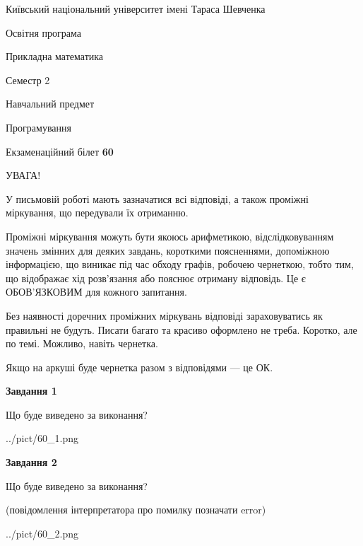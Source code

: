 \documentclass[12pt, ukrainian]{article}
\begin{document}
{{\begin {small}\par
{ \center  Київський національний університет імені Тараса Шевченка \par}
{\parbox {5 cm}{Освітня програма \hfill}{\parbox {7 cm}{Прикладна математика\hfill}}\parbox {6 cm}{\hfill Семестр 2}}\par
{\parbox {5 cm} {Навчальний предмет \hfill}\parbox {7 cm}{Програмування \hfill}\parbox {6cm}{\hfill}\par}\vspace{-7pt} \end{small}}{\center Екзаменаційний білет \No \textbf
{ 60 }\par}}
{
\begin {large}
УВАГА!

У письмовій роботі мають зазначатися всі відповіді, а також проміжні міркування, що передували їх отриманню.

Проміжні міркування можуть бути якоюсь арифметикою, відслідковуванням зна\-чень змінних для деяких завдань,
короткими поясненнями, допоміжною інформацією, що виникає під час обходу графів, робочею чернеткою,
тобто тим, що відображає хід розв’язання або пояснює отриману відповідь.
Це є ОБОВ’ЯЗКОВИМ для кожного запитання.

Без наявності доречних проміжних міркувань відповіді зараховуватись як правиль\-ні не будуть.
Писати багато та красиво оформлено не треба. Коротко, але по темі. Можли\-во, навіть чернетка.

Якщо на аркуші буде чернетка разом з відповідями --- це ОК.

\newpage

{\begin {center}\textbf{Завдання 1}\end {center}}\par
Що буде виведено за виконання?\par
\begin{center}
	{../pict/60_1.png}
\end{center}
\newpage

{\begin {center}\textbf{Завдання 2}\end {center}}\par
Що буде виведено за виконання?\par
 (повідомлення інтерпретатора про помилку позначати error)\par
\begin{center}
	{../pict/60_2.png}
\end{center}
\newpage


\end{large}}
\end{document}
